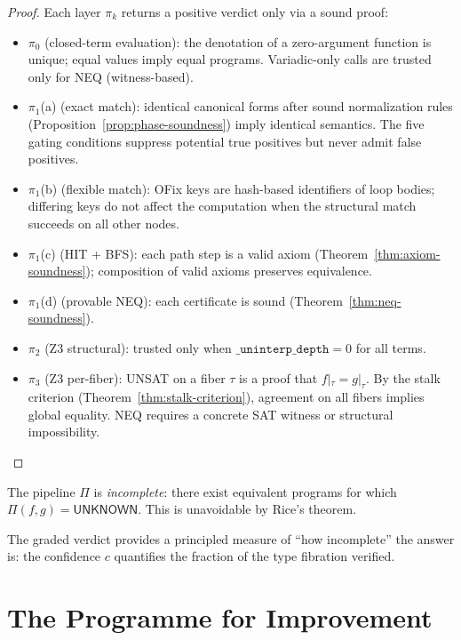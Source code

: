 \begin{proof}
Each layer $\pi_k$ returns a positive verdict only via a sound
proof:
\begin{itemize}
  \item $\pi_0$ (closed-term evaluation): the denotation of a
    zero-argument function is unique; equal values imply equal
    programs.  Variadic-only calls are trusted only for NEQ
    (witness-based).
  \item $\pi_1$(a) (exact match): identical canonical forms after
    sound normalization rules (Proposition~\ref{prop:phase-soundness})
    imply identical semantics.  The five gating conditions suppress
    potential true positives but never admit false positives.
  \item $\pi_1$(b) (flexible match): OFix keys are hash-based
    identifiers of loop bodies; differing keys do not affect the
    computation when the structural match succeeds on all other
    nodes.
  \item $\pi_1$(c) (HIT + BFS): each path step is a valid axiom
    (Theorem~\ref{thm:axiom-soundness}); composition of valid
    axioms preserves equivalence.
  \item $\pi_1$(d) (provable NEQ): each certificate is sound
    (Theorem~\ref{thm:neq-soundness}).
  \item $\pi_2$ (Z3 structural): trusted only when
    $\texttt{\_uninterp\_depth} = 0$ for all terms.
  \item $\pi_3$ (Z3 per-fiber): UNSAT on a fiber $\tau$ is a proof
    that $f|_\tau = g|_\tau$.  By the stalk criterion
    (Theorem~\ref{thm:stalk-criterion}), agreement on all fibers
    implies global equality.  NEQ requires a concrete SAT witness
    or structural impossibility.
\end{itemize}
\end{proof}

\begin{theorem}
\label{thm:incompleteness}
The pipeline $\Pi$ is \emph{incomplete}: there exist equivalent
programs for which $\Pi(f,g) = \mathsf{UNKNOWN}$.  This is
unavoidable by Rice's theorem.
\end{theorem}

The graded verdict provides a principled measure of ``how
incomplete'' the answer is: the confidence $c$ quantifies
the fraction of the type fibration verified.


\section{The Programme for Improvement}
\label{sec:programme}

